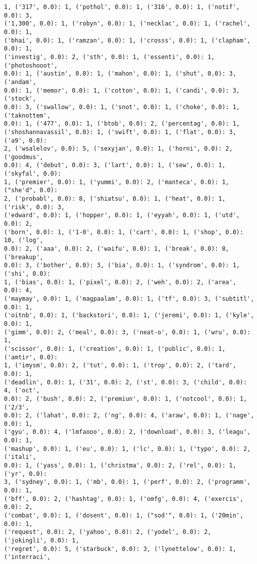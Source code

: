 \documentclass[11pt]{article}
\begin{document}
\begin{Verbatim}[commandchars=\\\{\}]
1, ('317', 0.0): 1, ('pothol', 0.0): 1, ('316', 0.0): 1, ('notif', 0.0): 3,
('1,300', 0.0): 1, ('robyn', 0.0): 1, ('necklac', 0.0): 1, ('rachel', 0.0): 1,
('bhai', 0.0): 1, ('ramzan', 0.0): 1, ('crosss', 0.0): 1, ('clapham', 0.0): 1,
('investig', 0.0): 2, ('sth', 0.0): 1, ('essenti', 0.0): 1, ('photoshooot',
0.0): 1, ('austin', 0.0): 1, ('mahon', 0.0): 1, ('shut', 0.0): 3, ('andam',
0.0): 1, ('memor', 0.0): 1, ('cotton', 0.0): 1, ('candi', 0.0): 3, ('stock',
0.0): 3, ('swallow', 0.0): 1, ('snot', 0.0): 1, ('choke', 0.0): 1, ('taknottem',
0.0): 1, ('477', 0.0): 1, ('btob', 0.0): 2, ('percentag', 0.0): 1,
('shoshannavassil', 0.0): 1, ('swift', 0.0): 1, ('flat', 0.0): 3, ('a9', 0.0):
2, ('wsalelov', 0.0): 5, ('sexyjan', 0.0): 1, ('horni', 0.0): 2, ('goodmus',
0.0): 4, ('debut', 0.0): 3, ('lart', 0.0): 1, ('sew', 0.0): 1, ('skyfal', 0.0):
1, ('premier', 0.0): 1, ('yummi', 0.0): 2, ('manteca', 0.0): 1, ("she'd", 0.0):
2, ('probabl', 0.0): 8, ('shiatsu', 0.0): 1, ('heat', 0.0): 1, ('risk', 0.0): 3,
('edward', 0.0): 1, ('hopper', 0.0): 1, ('eyyah', 0.0): 1, ('utd', 0.0): 2,
('born', 0.0): 1, ('1-0', 0.0): 1, ('cart', 0.0): 1, ('shop', 0.0): 10, ('log',
0.0): 2, ('aaa', 0.0): 2, ('waifu', 0.0): 1, ('break', 0.0): 8, ('breakup',
0.0): 3, ('bother', 0.0): 3, ('bia', 0.0): 1, ('syndrom', 0.0): 1, ('shi', 0.0):
1, ('bias', 0.0): 1, ('pixel', 0.0): 2, ('weh', 0.0): 2, ('area', 0.0): 4,
('maymay', 0.0): 1, ('magpaalam', 0.0): 1, ('tf', 0.0): 3, ('subtitl', 0.0): 1,
('oitnb', 0.0): 1, ('backstori', 0.0): 1, ('jeremi', 0.0): 1, ('kyle', 0.0): 1,
('gimm', 0.0): 2, ('meal', 0.0): 3, ('neat-o', 0.0): 1, ('wru', 0.0): 1,
('scissor', 0.0): 1, ('creation', 0.0): 1, ('public', 0.0): 1, ('amtir', 0.0):
1, ('imysm', 0.0): 2, ('tut', 0.0): 1, ('trop', 0.0): 2, ('tard', 0.0): 1,
('deadlin', 0.0): 1, ('31', 0.0): 2, ('st', 0.0): 3, ('child', 0.0): 4, ('oct',
0.0): 2, ('bush', 0.0): 2, ('premiun', 0.0): 1, ('notcool', 0.0): 1, ('2/3',
0.0): 2, ('lahat', 0.0): 2, ('ng', 0.0): 4, ('araw', 0.0): 1, ('nage', 0.0): 1,
('gyu', 0.0): 4, ('lmfaooo', 0.0): 2, ('download', 0.0): 3, ('leagu', 0.0): 1,
('mashup', 0.0): 1, ('eu', 0.0): 1, ('lc', 0.0): 1, ('typo', 0.0): 2, ('itali',
0.0): 1, ('yass', 0.0): 1, ('christma', 0.0): 2, ('rel', 0.0): 1, ('yr', 0.0):
3, ('sydney', 0.0): 1, ('mb', 0.0): 1, ('perf', 0.0): 2, ('programm', 0.0): 1,
('bff', 0.0): 2, ('hashtag', 0.0): 1, ('omfg', 0.0): 4, ('exercis', 0.0): 2,
('combat', 0.0): 1, ('dosent', 0.0): 1, ("sod'", 0.0): 1, ('20min', 0.0): 1,
('request', 0.0): 2, ('yahoo', 0.0): 2, ('yodel', 0.0): 2, ('jokingli', 0.0): 1,
('regret', 0.0): 5, ('starbuck', 0.0): 3, ('lynettelow', 0.0): 1, ('interraci',

\end{Verbatim}
\end{document}
